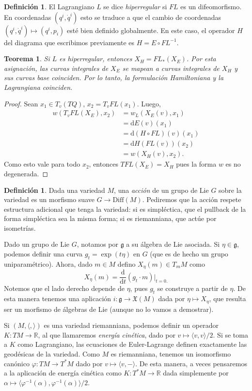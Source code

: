 \documentclass[11pt, a4paper]{article}
\newcommand{\RR}{\mathbb{R}}
\newcommand{\XX}{\mathfrak{X}}
\newcommand{\fkg}{\mathfrak{g}}
\newcommand{\dd}{\mathrm{d}}
\newcommand{\ddt}{\frac{\dd}{\dd t}}
\theoremstyle{plain}
\newtheorem{thm}[prop]{Teorema}
\theoremstyle{definition}
\newtheorem{defn}[prop]{Definición}
\begin{document}
\begin{defn} El Lagrangiano $L$ se dice \emph{hiperregular} si $FL$ es un difeomorfismo. En coordenadas $(q^i,\dot{q}^i)$ esto se traduce a que el cambio de coordenadas $(q^i,\dot{q}^i)\mapsto (q^i,p_i)$ esté bien definido globalmente. En este caso, el operador $H$ del diagrama que escribimos previamente es $H=E\circ FL^{-1}$.
\end{defn}

\begin{thm} Si $L$ es hiperregular, entonces $X_H = FL_*(X_E)$. Por esta asignación, las curvas integrales de $X_E$ se mapean a curvas integrales de $X_H$ y sus curvas base coinciden. Por lo tanto, la formulación Hamiltoniana y la Lagrangiana coinciden.
\end{thm}
\begin{proof} Sean $x_1\in T_v(TQ)$, $x_2 = T_vFL(x_1)$. Luego,
\begin{align*}
w(T_vFL(X_E), x_2) &= w_L(X_E(v), x_1)\\
&= \dd E(v)(x_1)\\
&= \dd (H\circ FL)(v)(x_1)\\
&=\dd H(FL(v))(x_2)\\
&=w(X_H(v), x_2).
\end{align*}
Como esto vale para todo $x_2$, entonces $TFL(X_E)=X_H$ pues la forma $w$ es no degenerada.
\end{proof}

\begin{defn} Dada una variedad $M$, una \emph{acción} de un grupo de Lie $G$ sobre la variedad es un morfismo suave $G\to \mathrm{Diff}(M)$. Pediremos que la acción respete estructura adicional que tenga la variedad: si es simpléctica, que el pullback de la forma simpléctica sea la misma forma; si es riemanniana, que actúe por isometrías.
\end{defn}
Dado un grupo de Lie $G$, notamos por $\fkg$ a su álgebra de Lie asociada. Si $\eta\in\fkg$, podemos definir una curva $g_t = \exp(t\eta)$ en $G$ (que es de hecho un grupo uniparamétrico). Ahora, dado $m\in M$ defino $X_\eta(m)\in T_m M$ como
\[X_\eta(m) = \ddt (g_t \cdot m) \bigg|_{t=0.}\]
Notemos que el lado derecho depende de $\eta$, pues $g_t$ se construye a partir de $\eta$. De esta manera tenemos una aplicación $i:\fkg\to \XX(M)$ dada por $\eta\mapsto X_{\eta}$, que resulta ser un morfismo de álgebras de Lie (aunque no lo vamos a demostrar).

Si $(M,\langle,\rangle)$ es una variedad riemanniana, podemos definir un operador $K:TM\to \RR$, al que llamaremos \emph{energía cinética}, dado por $v\mapsto \langle v,v\rangle /2$. Si se toma a $K$ como Lagrangiano, las ecuaciones de Euler-Lagrange definen exactamente las geodésicas de la variedad. Como $M$ es riemanniana, tenemos un isomorfismo canónico $\varphi:TM\to T^*M$ dado por $v\mapsto \langle v,-\rangle$. De esta manera, a veces pensaremos a la aplicación de energía cinética como $K:T^*M\to \RR$ dada simplemente por $\alpha \mapsto \langle \varphi^{-1}(\alpha), \varphi^{-1}(\alpha)\rangle/2$.
\end{document}
